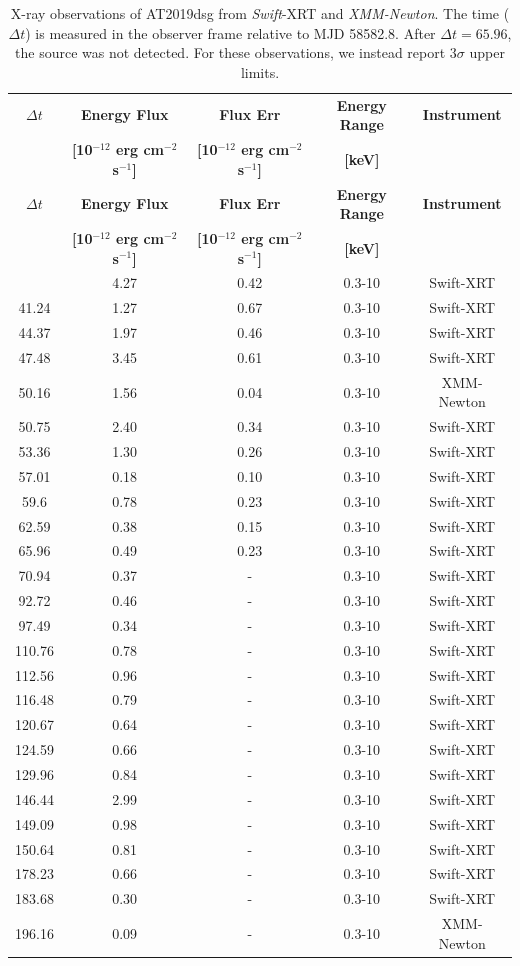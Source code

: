 \documentclass{nature_plusfigure}
\begin{document}
\begin{methods}
\begin{longtable}{|c|c|c|c|c|}
\caption{X-ray observations of AT2019dsg from \textit{Swift}-XRT and \textit{XMM-Newton}. The time ($\Delta t$) is measured in the observer frame relative to MJD 58582.8. After $\Delta t = 65.96$, the source was not detected. For these observations, we instead report $3\sigma$ upper limits.\label{tab:xray_data}}\\
\hline
\textbf{$\Delta t$}&\textbf{Energy Flux} &\textbf{Flux Err}&\textbf{Energy Range}&\textbf{Instrument}\\
& \textbf{[10$^{-12}$ erg cm$^{-2}$ s$^{-1}$]} & \textbf{[10$^{-12}$ erg cm$^{-2}$ s$^{-1}$]} & \textbf{[keV]}& \\
\hline%
\endfirsthead
\hline%
\textbf{$\Delta t$}&\textbf{Energy Flux} &\textbf{Flux Err}&\textbf{Energy Range}&\textbf{Instrument}\\
& \textbf{[10$^{-12}$ erg cm$^{-2}$ s$^{-1}$]} & \textbf{[10$^{-12}$ erg cm$^{-2}$ s$^{-1}$]} & \textbf{[keV]}& \\
\hline%
\endhead
\hline
\endfoot
\hline
\endlastfoot
37.37&4.27&0.42&0.3{-}10&Swift{-}XRT\\%
41.24&1.27&0.67&0.3{-}10&Swift{-}XRT\\%
44.37&1.97&0.46&0.3{-}10&Swift{-}XRT\\%
47.48&3.45&0.61&0.3{-}10&Swift{-}XRT\\%
50.16&1.56&0.04&0.3{-}10&XMM{-}Newton\\%
50.75&2.40&0.34&0.3{-}10&Swift{-}XRT\\%
53.36&1.30&0.26&0.3{-}10&Swift{-}XRT\\%
57.01&0.18&0.10&0.3{-}10&Swift{-}XRT\\%
59.6&0.78&0.23&0.3{-}10&Swift{-}XRT\\%
62.59&0.38&0.15&0.3{-}10&Swift{-}XRT\\%
65.96&0.49&0.23&0.3{-}10&Swift{-}XRT\\%
\hline
70.94&0.37&-&0.3{-}10&Swift{-}XRT\\%
92.72&0.46&-&0.3{-}10&Swift{-}XRT\\%
97.49&0.34&-&0.3{-}10&Swift{-}XRT\\%
110.76&0.78&-&0.3{-}10&Swift{-}XRT\\%
112.56&0.96&-&0.3{-}10&Swift{-}XRT\\%
116.48&0.79&-&0.3{-}10&Swift{-}XRT\\%
120.67&0.64&-&0.3{-}10&Swift{-}XRT\\%
124.59&0.66&-&0.3{-}10&Swift{-}XRT\\%
129.96&0.84&-&0.3{-}10&Swift{-}XRT\\%
146.44&2.99&-&0.3{-}10&Swift{-}XRT\\%
149.09&0.98&-&0.3{-}10&Swift{-}XRT\\%
150.64&0.81&-&0.3{-}10&Swift{-}XRT\\%
178.23&0.66&-&0.3{-}10&Swift{-}XRT\\%
183.68&0.30&-&0.3{-}10&Swift{-}XRT\\%
196.16&0.09&-&0.3{-}10&XMM{-}Newton\\%
\end{longtable}


\end{methods}
\end{document}
